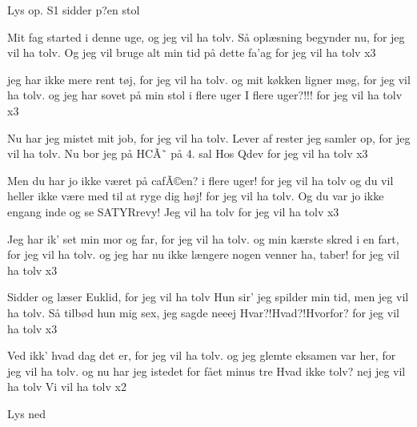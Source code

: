 \documentclass[a4paper,11pt]{article}
\begin{document}
\begin{sketch}

\scene Lys op. S1 sidder p?en stol


 Mit fag started i denne uge, og jeg vil ha tolv.
 Så oplæsning begynder nu, for jeg vil ha tolv.
 Og jeg vil bruge alt min tid på dette fa'ag
 for jeg vil ha tolv x3


 jeg har ikke mere rent tøj, for jeg vil ha tolv.
 og mit køkken ligner møg, for jeg vil ha tolv.
 og jeg har sovet på min stol i flere uger
 I flere uger?!!!
 for jeg vil ha tolv x3


 Nu har jeg mistet mit job, for jeg vil ha tolv.
 Lever af rester jeg samler op, for jeg vil ha tolv.
 Nu bor jeg på HCÃ˜ på 4. sal
 Hos Qdev
 for jeg vil ha tolv x3

 Men du har jo ikke været på cafÃ©en? i flere uger!
 for jeg vil ha tolv
 og du vil heller ikke være med til at ryge dig høj!
 for jeg vil ha tolv.
 Og du var jo ikke engang inde og se SATYRrevy!
 Jeg vil ha tolv
 for jeg vil ha tolv x3

 Jeg har ik' set min mor og far, for jeg vil ha tolv.
 og min kærste skred i en fart, for jeg vil ha tolv.
 og jeg har nu ikke længere nogen venner
 ha, taber!
 for jeg vil ha tolv x3

 Sidder og læser Euklid, for jeg vil ha tolv
 Hun sir' jeg spilder min tid, men jeg vil ha tolv.
 Så tilbød hun mig sex, jeg sagde neeej
 Hvar?!Hvad?!Hvorfor?
 for jeg vil ha tolv x3

 Ved ikk' hvad dag det er, for jeg vil ha tolv.
 og jeg glemte eksamen var her, for jeg vil ha tolv.
 og nu har jeg istedet for fået minus tre
 Hvad ikke tolv?
 nej jeg vil ha tolv
 Vi vil ha tolv x2




\scene Lys ned

\end{sketch}
\end{document}
